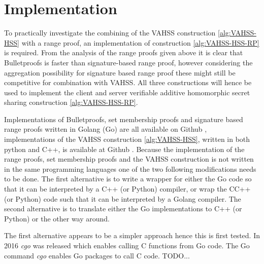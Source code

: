 \section{Implementation}
To practically investigate the combining of the VAHSS construction \ref{alg:VAHSS-HSS} with a range proof, an implementation of construction \ref{alg:VAHSS-HSS-RP} is required. %
 From the analysis of the range proofs given above it is clear that Bulletproofs is faster than signature-based range proof, however considering the aggregation possibility for signature based range proof these might still be competitive for combination with VAHSS.  All three constructions will hence be used to implement the client and server verifiable additive homomorphic secret sharing construction \ref{alg:VAHSS-HSS-RP}. 

Implementations of Bulletproofs, set membership proofs and signature based range proofs written in Golang (Go) are all available on Github \cite{Git:RP}, implementations of the VAHSS construction \ref{alg:VAHSS-HSS}, written in both python and C++, is available at Github \cite{Git:python_vahss} \cite{Git:C_vahss}.
Because the implementation of the range proofs, set membership proofs and the VAHSS construction is not written in the same programming languages one of the two following modifications needs to be done. The first alternative is to write a wrapper for either the Go code so that it can be interpreted by a C++ (or Python) compiler, or wrap the CC++ (or Python) code such that it can be interpreted by a Golang compiler. The second alternative is to translate either the Go implementations to C++ (or Python) or the other way around. 

The first alternative appears to be a simpler approach hence this is first tested. In 2016 \textit{cgo} was released which enables calling C functions from Go code. 
The Go command \textit{cgo} enables Go packages to call C code. TODO...

